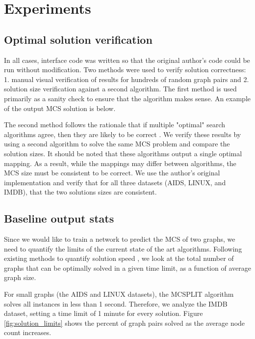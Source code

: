 \section{Experiments}
\subsection{Optimal solution verification}
In all cases, interface code was written so that the original author's code could be run without modification. Two methods were used to verify solution correctness: 1. manual visual verification of results for hundreds of random graph pairs and 2. solution size verification against a second algorithm. The first method is used primarily as a sanity check to ensure that the algorithm makes sense. An example of the output MCS solution is below. 


The second method follows the rationale that if multiple "optimal" search algorithms agree, then they are likely to be correct \cite{korf2014you}. We verify these results by using a second algorithm \cite{mccreesh2016clique} to solve the same MCS problem and compare the solution sizes. It should be noted that these algorithms output a single optimal mapping. As a result, while the mappings may differ between algorithms, the MCS size must be consistent to be correct. We use the author's original implementation and verify that for all three datasets (AIDS, LINUX, and IMDB), that the two solutions sizes are consistent.

\subsection{Baseline output stats}
Since we would like to train a network to predict the MCS of two graphs, we need to quantify the limits of the current state of the art algorithms. Following existing methods to quantify solution speed \cite{hoffmann2018observations}, we look at the total number of graphs that can be optimally solved in a given time limit, as a function of average graph size.

For small graphs (the AIDS and LINUX datasets), the MCSPLIT algorithm solves all instances in less than 1 second. Therefore, we analyze the IMDB dataset, setting a time limit of 1 minute for every solution. Figure \ref{fig:solution_limits} shows the percent of graph pairs solved as the average node count increases. 

